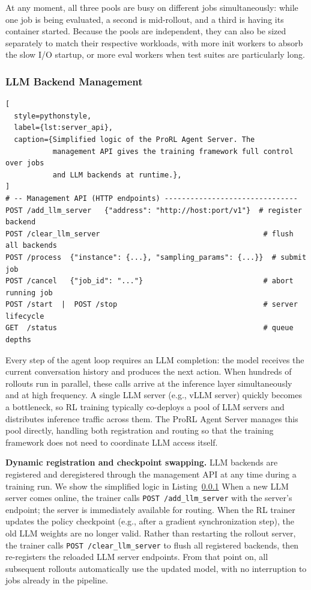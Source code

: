 At any moment, all three pools are busy on different jobs simultaneously: while one job is being evaluated, a second is mid-rollout, and a third is having its container started.
Because the pools are independent, they can also be sized separately to match their respective workloads, with more init workers to absorb the slow I/O startup, or more eval workers when test suites are particularly long.

\subsubsection{LLM Backend Management}
\label{sec:llm-mgmt}

\begin{lstlisting}[
  style=pythonstyle,
  label={lst:server_api},
  caption={Simplified logic of the ProRL Agent Server. The
           management API gives the training framework full control over jobs
           and LLM backends at runtime.},
]
# -- Management API (HTTP endpoints) -------------------------------
POST /add_llm_server   {"address": "http://host:port/v1"}  # register backend
POST /clear_llm_server                                      # flush all backends
POST /process  {"instance": {...}, "sampling_params": {...}}  # submit job
POST /cancel   {"job_id": "..."}                            # abort running job
POST /start  |  POST /stop                                  # server lifecycle
GET  /status                                                # queue depths
\end{lstlisting}

Every step of the agent loop requires an LLM completion: the model receives the current conversation history and produces the next action.
When hundreds of rollouts run in parallel, these calls arrive at the inference layer simultaneously and at high frequency.
A single LLM server (e.g., vLLM server) quickly becomes a bottleneck, so RL training typically co-deploys a pool of LLM servers and distributes inference traffic across them.
The ProRL Agent Server manages this pool directly, handling both registration and routing so that the training framework does not need to coordinate LLM access itself.

\textbf{Dynamic registration and checkpoint swapping.}
LLM backends are registered and deregistered through the management API at any time during a training run. We show the simplified logic in Listing~\ref{sec:llm-mgmt}
When a new LLM server comes online, the trainer calls \texttt{POST /add\_llm\_server} with the server's endpoint; the server is immediately available for routing.
When the RL trainer updates the policy checkpoint (e.g., after a gradient synchronization step), the old LLM weights are no longer valid.
Rather than restarting the rollout server, the trainer calls \texttt{POST /clear\_llm\_server} to flush all registered backends, then re-registers the reloaded LLM server endpoints.
From that point on, all subsequent rollouts automatically use the updated model, with no interruption to jobs already in the pipeline.


